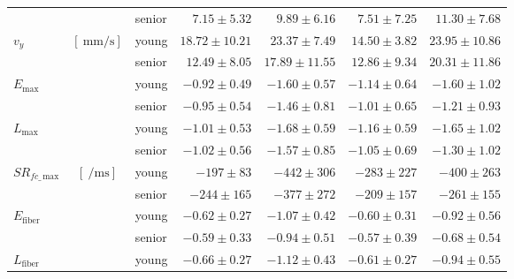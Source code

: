 \begin{table}[!htb]
\begin{center}
\begin{threeparttable}
\begin{tabular}{@{}lclrrrr@{}}
															&                   							     				& senior    & $7.15 \pm 5.32$   & $9.89 \pm 6.16$  &  $7.51 \pm 7.25$  & $11.30 \pm 7.68$  \\[4pt]
\multirow{2}{*}{$v_y$}\tnote{$1$, $4$}						& \multirow{2}{*}{$\left[\SI{}{\milli\meter/\second}\right]$} 	& young     & $18.72 \pm 10.21$ & $23.37 \pm 7.49$ &  $14.50 \pm 3.82$ & $23.95 \pm 10.86$ \\
                  											&                   							     				& senior    & $12.49 \pm 8.05$  & $17.89 \pm 11.55$&  $12.86 \pm 9.34$ & $20.31 \pm 11.86$ \\[4pt]
\multirow{2}{*}{$E_{\mathrm{max}}$}\tnote{$1$}				&                   							     				& young     & $-0.92 \pm 0.49$   & $-1.60 \pm 0.57$  &  $-1.14 \pm 0.64$  & $-1.60 \pm 1.02$   \\
 				                    							&                   							     				& senior    & $-0.95 \pm 0.54$   & $-1.46 \pm 0.81$  &  $-1.01 \pm 0.65$  & $-1.21 \pm 0.93$   \\[4pt]
\multirow{2}{*}{$L_{\mathrm{max}}$}\tnote{$1$}				&                   							     				& young     & $-1.01 \pm 0.53$   & $-1.68 \pm 0.59$  &  $-1.16 \pm 0.59$  & $-1.65 \pm 1.02$   \\
                  											&                   							     				& senior    & $-1.02 \pm 0.56$   & $-1.57 \pm 0.85$  &  $-1.05 \pm 0.69$  & $-1.30 \pm 1.02$   \\[4pt]
\multirow{2}{*}{$SR_{fc\_\,\mathrm{max}}$}\tnote{$2$, $3$}	& \multirow{2}{*}{$\left[\SI{}{\per\milli\second}\right]$} 		& young     & $-197 \pm 83$   	& $-442 \pm 306$    &  $-283 \pm 227$    & $-400 \pm 263$     \\
                  											&                   							     				& senior    & $-244 \pm 165$  	& $-377 \pm 272$    &  $-209 \pm 157$    & $-261 \pm 155$     \\[4pt]
\multirow{2}{*}{$E_{\mathrm{fiber}}$}\tnote{$2$}	        		&                   							     				& young     & $-0.62 \pm 0.27$   & $-1.07 \pm 0.42$  &  $-0.60 \pm 0.31$  & $-0.92 \pm 0.56$   \\
                  											&                   							     				& senior    & $-0.59 \pm 0.33$   & $-0.94 \pm 0.51$  &  $-0.57 \pm 0.39$  & $-0.68 \pm 0.54$   \\[4pt]
\multirow{2}{*}{$L_{\mathrm{fiber}}$}\tnote{$2$}	        		&                   							     				& young     & $-0.66 \pm 0.27$   & $-1.12 \pm 0.43$  &  $-0.61 \pm 0.27$  & $-0.94 \pm 0.55$   \\

\end{tabular}
\end{threeparttable}
\end{center}
\end{table}
